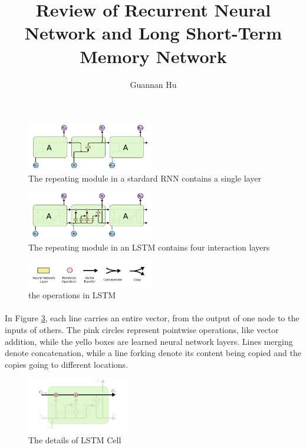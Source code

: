 \documentclass[12pt,a4paper]{article}
\begin{document}
\title{Review of Recurrent Neural Network and Long Short-Term Memory Network}
\author{Guannan Hu}
\maketitle

\begin{figure}
\centering   
\includegraphics[width=0.5\textwidth]{pic/1.PNG}
\caption{The repeating module in a stardard RNN contains a single layer}
 \label{fig:1} 
\end{figure}



\begin{figure}
\centering   
\includegraphics[width=0.5\textwidth]{pic/2.PNG}
\caption{The repeating module in an LSTM contains four interaction layers}
 \label{fig:2} 
\end{figure}

\begin{figure}[h!]
\centering   
\includegraphics[width=0.5\textwidth]{pic/3.PNG}
\caption{the operations in LSTM}
 \label{fig:3} 
\end{figure}
\paragraph{} In Figure \ref{fig:3}, each line carries an entire vector, from the output of one node to the inputs of others. The pink circles represent pointwise operations, like vector addition, while the yello boxes are learned neural network layers. Lines merging denote concatenation, while a line forking denote its content being copied and the copies going to different locations.


\begin{figure}
\centering   
\includegraphics[width=0.4\textwidth]{pic/4.PNG}
\caption{The details of LSTM Cell}
 \label{fig:4} 
\end{figure}
\end{document}
